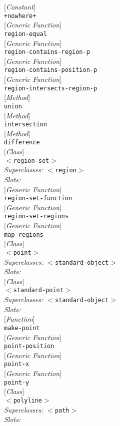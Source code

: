 \documentclass[10pt]{book}
\newenvironment{defother}[2]{[\textit{#1}]\\\texttt{#2}}{\\}
\newenvironment{defun}[1]{\begin{defother}{Function}{#1}}{\end{defother}}
\newenvironment{defgeneric}[1]{\begin{defother}{Generic Function}{#1}}{\end{defother}}
\newenvironment{defmethod}[1]{\begin{defother}{Method}{#1}}{\end{defother}}
\newenvironment{defconstant}[1]{\begin{defother}{Constant}{#1}}{\end{defother}}
\newenvironment{defclass}[2]{[\textit{Class}]\\\texttt{#1}\\\textit{Superclasses:} \texttt{#2}\\\textit{Slots:}}{\\}
\begin{document}
\begin{defconstant}{+nowhere+}\end{defconstant}
\begin{defgeneric}{region-equal}\end{defgeneric}
\begin{defgeneric}{region-contains-region-p}\end{defgeneric}
\begin{defgeneric}{region-contains-position-p}\end{defgeneric}
\begin{defgeneric}{region-intersects-region-p}\end{defgeneric}
\begin{defmethod}{union}\end{defmethod} %
\begin{defmethod}{intersection}\end{defmethod} %
\begin{defmethod}{difference}\end{defmethod}%
\begin{defclass}{$<$region-set$>$}{$<$region$>$}\end{defclass}
\begin{defgeneric}{region-set-function}\end{defgeneric}
\begin{defgeneric}{region-set-regions}\end{defgeneric}
\begin{defgeneric}{map-regions}\end{defgeneric} %
\begin{defclass}{$<$point$>$}{$<$standard-object$>$}\end{defclass} %
\begin{defclass}{$<$standard-point$>$}{$<$standard-object$>$}\end{defclass}
\begin{defun}{make-point}\end{defun}
\begin{defgeneric}{point-position}\end{defgeneric} %
\begin{defgeneric}{point-x}\end{defgeneric} %
\begin{defgeneric}{point-y}\end{defgeneric} %
\begin{defclass}{$<$polyline$>$}{$<$path$>$}\end{defclass}
\end{document}
